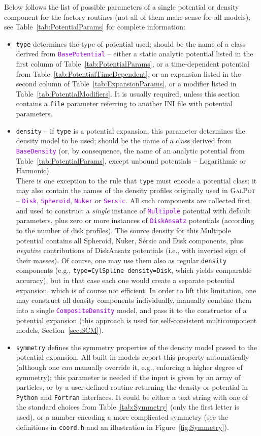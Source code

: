 \documentclass[12pt]{article}
\newcommand{\Python}{\texttt{Python}\xspace}
\newcommand{\Fortran}{\texttt{Fortran}\xspace}
\newcommand{\ttt}[1]{\textcolor{darkviolet}{\texttt{#1}}}
\newcommand{\ppp}[1]{\textcolor{darkolive} {\texttt{#1}}}
\begin{document}
Below follows the list of possible parameters of a single potential or density component for the factory routines (not all of them make sense for all models); see Table~\ref{tab:PotentialParams} for complete information:
\begin{itemize}
\item \ppp{type}  determines the type of potential used; should be the name of a class derived from \ttt{BasePotential} -- either a static analytic potential listed in the first column of Table~\ref{tab:PotentialParams}, or a time-dependent potential from Table~\ref{tab:PotentialTimeDependent}, or an expansion listed in the second column of Table~\ref{tab:ExpansionParams}, or a modifier listed in Table~\ref{tab:PotentialModifiers}. It is usually required, unless this section contains a \ppp{file} parameter referring to another INI file with potential parameters.
\item  \ppp{density} -- if \ppp{type} is a potential expansion, this parameter determines the density model to be used; should be the name of a class derived from \ttt{BaseDensity} (or, by consequence, the name of an analytic potential from Table~\ref{tab:PotentialParams}, except unbound potentials -- Logarithmic or Harmonic).\\
\label{sec:PotentialGalpot}%
There is one exception to the rule that \ppp{type} must encode a potential class: it may also contain the names of the density profiles originally used in \textsc{GalPot} -- \ttt{Disk}, \ttt{Spheroid}, \ttt{Nuker} or \ttt{Sersic}. All such components are collected first, and used to construct a \textit{single} instance of \ttt{Multipole} potential with default parameters, plus zero or more instances of \ttt{DiskAnsatz} potentials (according to the number of disk profiles). The source density for this Multipole potential contains all Spheroid, Nuker, S\'ersic and Disk components, plus \textit{negative} contributions of DiskAnsatz potentials (i.e., with inverted sign of their masses). Of course, one may use them also as regular \ppp{density} components (e.g., \ppp{type=CylSpline density=Disk}, which yields comparable accuracy), but in that case each one would create a separate potential expansion, which is of course not efficient. In order to lift this limitation, one may construct all density components individually, manually combine them into a single \ttt{CompositeDensity} model, and pass it to the constructor of a potential expansion (this approach is used for self-consistent multicomponent models, Section~\ref{sec:SCM}).
\item \ppp{symmetry}  defines the symmetry properties of the density model passed to the potential expansion. All built-in models report this property automatically (although one \textit{can} manually override it, e.g., enforcing a higher degree of symmetry); this parameter is needed if the input is given by an array of particles, or by a user-defined routine returning the density or potential in \Python and \Fortran interfaces. It could be either a text string with one of the standard choices from Table~\ref{tab:Symmetry} (only the first letter is used), or a number encoding a more complicated symmetry (see the definitions in \texttt{coord.h} and an illustration in Figure~\ref{fig:Symmetry}). 

\end{itemize}
\end{document}
